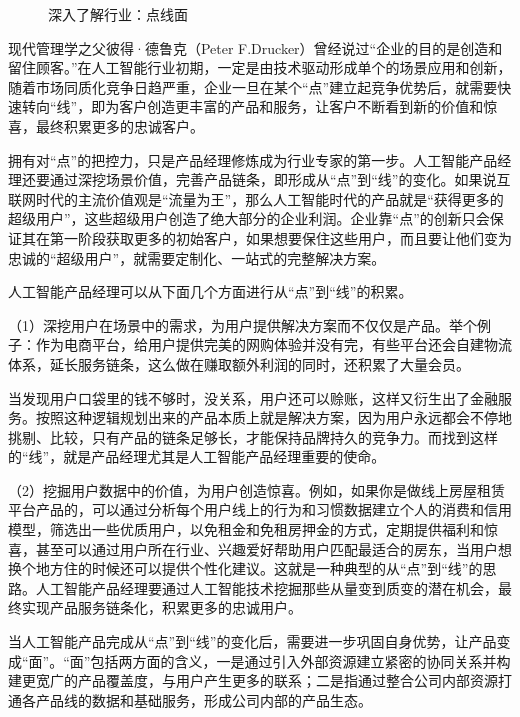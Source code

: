 \documentclass[letterpaper,11pt,english]{sphinxmanual}
\begin{document}
\begin{figure}[H]
\centering
\capstart

\noindent{}
\caption{深入了解行业：点线面}\label{\detokenize{chapter_knowledge/industry_analysis:id31}}\end{figure}

现代管理学之父彼得·德鲁克（Peter
F.Drucker）曾经说过“企业的目的是创造和留住顾客。”在人工智能行业初期，一定是由技术驱动形成单个的场景应用和创新，随着市场同质化竞争日趋严重，企业一旦在某个“点”建立起竞争优势后，就需要快速转向“线”，即为客户创造更丰富的产品和服务，让客户不断看到新的价值和惊喜，最终积累更多的忠诚客户。

拥有对“点”的把控力，只是产品经理修炼成为行业专家的第一步。人工智能产品经理还要通过深挖场景价值，完善产品链条，即形成从“点”到“线”的变化。如果说互联网时代的主流价值观是“流量为王”，那么人工智能时代的产品就是“获得更多的超级用户”，这些超级用户创造了绝大部分的企业利润。企业靠“点”的创新只会保证其在第一阶段获取更多的初始客户，如果想要保住这些用户，而且要让他们变为忠诚的“超级用户”，就需要定制化、一站式的完整解决方案。

人工智能产品经理可以从下面几个方面进行从“点”到“线”的积累。

（1）深挖用户在场景中的需求，为用户提供解决方案而不仅仅是产品。举个例子：作为电商平台，给用户提供完美的网购体验并没有完，有些平台还会自建物流体系，延长服务链条，这么做在赚取额外利润的同时，还积累了大量会员。

当发现用户口袋里的钱不够时，没关系，用户还可以赊账，这样又衍生出了金融服务。按照这种逻辑规划出来的产品本质上就是解决方案，因为用户永远都会不停地挑剔、比较，只有产品的链条足够长，才能保持品牌持久的竞争力。而找到这样的“线”，就是产品经理尤其是人工智能产品经理重要的使命。

（2）挖掘用户数据中的价值，为用户创造惊喜。例如，如果你是做线上房屋租赁平台产品的，可以通过分析每个用户线上的行为和习惯数据建立个人的消费和信用模型，筛选出一些优质用户，以免租金和免租房押金的方式，定期提供福利和惊喜，甚至可以通过用户所在行业、兴趣爱好帮助用户匹配最适合的房东，当用户想换个地方住的时候还可以提供个性化建议。这就是一种典型的从“点”到“线”的思路。人工智能产品经理要通过人工智能技术挖掘那些从量变到质变的潜在机会，最终实现产品服务链条化，积累更多的忠诚用户。

当人工智能产品完成从“点”到“线”的变化后，需要进一步巩固自身优势，让产品变成“面”。“面”包括两方面的含义，一是通过引入外部资源建立紧密的协同关系并构建更宽广的产品覆盖度，与用户产生更多的联系；二是指通过整合公司内部资源打通各产品线的数据和基础服务，形成公司内部的产品生态。
\end{document}
